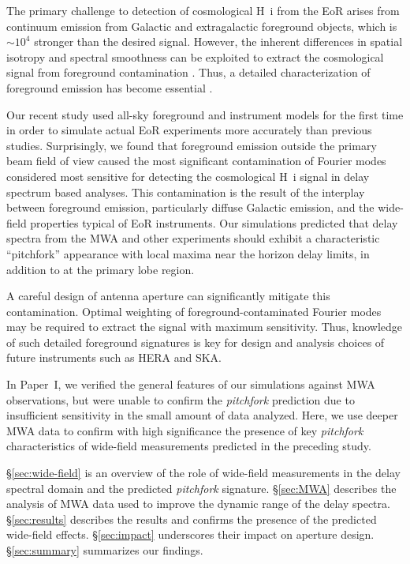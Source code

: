 \documentclass[preprint2,apjl,numberedappendix,twocolappendix,appendixfloats]{emulateapj}
\begin{document}
The primary challenge to detection of cosmological H~{\sc i} from the EoR arises from continuum emission from Galactic and extragalactic foreground objects, which is $\sim 10^4$ stronger than the desired signal. However, the inherent differences in spatial isotropy and spectral smoothness can be exploited to extract the cosmological signal from foreground contamination \citep[see, e.g.,][]{dim02,dim04,zal04,fur04,mor04,san05,fur06,mcq06,mor06,wan06,gle08}. Thus, a detailed characterization of foreground emission has become essential \citep{ali08,bow09,liu09,ber09,ber10,dat10,liu11,gho12,mor12,par12b,tro12,pob13,dil13,dil14,liu14a,liu14b,thy13,thy15}.

Our recent study \citep[][hereafter referred to as Paper~I]{thy15} used all-sky foreground and instrument models for the first time in order to simulate actual EoR experiments more accurately than previous studies. Surprisingly, we found that foreground emission outside the primary beam field of view caused the most significant contamination of Fourier modes considered most sensitive for detecting the cosmological H~{\sc i} signal in delay spectrum based analyses. This contamination is the result of the interplay between foreground emission, particularly diffuse Galactic emission, and the wide-field properties typical of EoR instruments. Our simulations predicted that delay spectra from the MWA and other experiments should exhibit a characteristic ``pitchfork'' appearance with local maxima near the horizon delay limits, in addition to at the primary lobe region.  

A careful design of antenna aperture can significantly mitigate this contamination. Optimal weighting of foreground-contaminated Fourier modes may be required to extract the signal with maximum sensitivity. Thus, knowledge of such detailed foreground signatures is key for design and analysis choices of future instruments such as HERA and SKA.

In Paper~I, we verified the general features of our simulations against MWA observations, but were unable to confirm the {\it pitchfork} prediction due to insufficient sensitivity in the small amount of data analyzed. Here, we use deeper MWA data to confirm with high significance the presence of key {\it pitchfork} characteristics of wide-field measurements predicted in the preceding study.  

\S\ref{sec:wide-field} is an overview of the role of wide-field measurements in the delay spectral domain and the predicted {\it pitchfork} signature. \S\ref{sec:MWA} describes the analysis of MWA data used to improve the dynamic range of the delay spectra. \S\ref{sec:results} describes the results and confirms the presence of the predicted wide-field effects. \S\ref{sec:impact} underscores their impact on aperture design. \S\ref{sec:summary} summarizes our findings.
\end{document}

